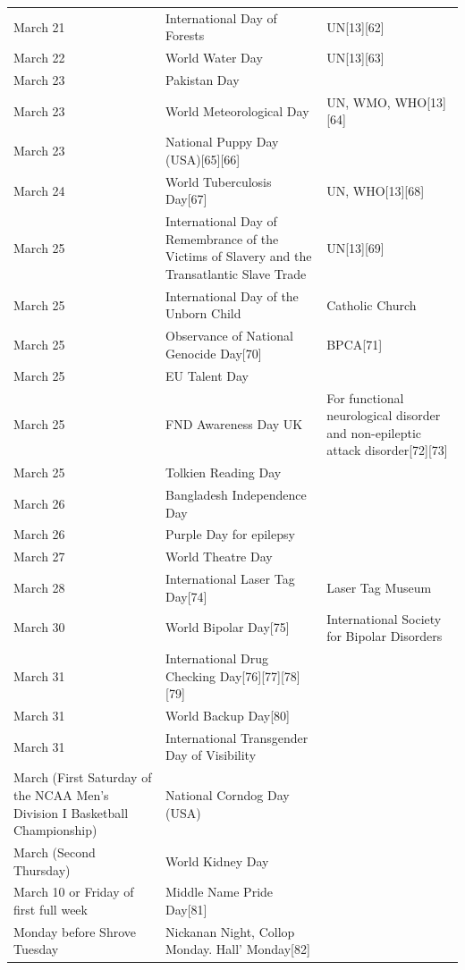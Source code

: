 \documentclass[
  openany]{book}
\begin{document}
\begin{longtable}[t]{>{\raggedright\arraybackslash}p{8em}>{\raggedright\arraybackslash}p{20em}>{\raggedright\arraybackslash}p{12em}}
\rowcolor{gray!6}  March 21 & International Day of Forests & UN[13][62]\\
March 22 & World Water Day & UN[13][63]\\
\rowcolor{gray!6}  March 23 & Pakistan Day & \\
March 23 & World Meteorological Day & UN, WMO, WHO[13][64]\\
\rowcolor{gray!6}  March 23 & National Puppy Day (USA)[65][66] & \\
\addlinespace
March 24 & World Tuberculosis Day[67] & UN, WHO[13][68]\\
\rowcolor{gray!6}  March 25 & International Day of Remembrance of the Victims of Slavery and the Transatlantic Slave Trade & UN[13][69]\\
March 25 & International Day of the Unborn Child & Catholic Church\\
\rowcolor{gray!6}  March 25 & Observance of National Genocide Day[70] & BPCA[71]\\
March 25 & EU Talent Day & \\
\addlinespace
\rowcolor{gray!6}  March 25 & FND Awareness Day UK & For functional neurological disorder and non-epileptic attack disorder[72][73]\\
March 25 & Tolkien Reading Day & \\
\rowcolor{gray!6}  March 26 & Bangladesh Independence Day & \\
March 26 & Purple Day for epilepsy & \\
\rowcolor{gray!6}  March 27 & World Theatre Day & \\
\addlinespace
March 28 & International Laser Tag Day[74] & Laser Tag Museum\\
\rowcolor{gray!6}  March 30 & World Bipolar Day[75] & International Society for Bipolar Disorders\\
March 31 & International Drug Checking Day[76][77][78][79] & \\
\rowcolor{gray!6}  March 31 & World Backup Day[80] & \\
March 31 & International Transgender Day of Visibility & \\
\addlinespace
\rowcolor{gray!6}  March (First Saturday of the NCAA Men's Division I Basketball Championship) & National Corndog Day (USA) & \\
March (Second Thursday) & World Kidney Day & \\
\rowcolor{gray!6}  March 10 or Friday of first full week & Middle Name Pride Day[81] & \\
Monday before Shrove Tuesday & Nickanan Night, Collop Monday. Hall' Monday[82] & \\

\end{longtable}
\end{document}
